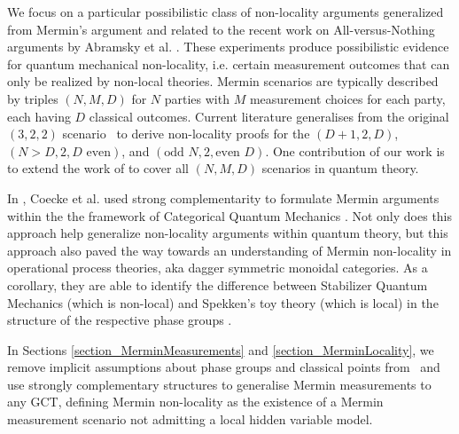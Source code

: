         We focus on a particular possibilistic class of non-locality arguments generalized from Mermin's argument \cite{mermin1990quantum} and related to the recent work on All-versus-Nothing arguments by Abramsky et al. \cite{NLC-AvN}. These experiments produce possibilistic evidence for quantum mechanical non-locality, i.e. certain measurement outcomes that can only be realized by non-local theories.  Mermin scenarios are typically described by triples $(N,M,D)$ for $N$ parties with $M$ measurement choices for each party, each having $D$ classical outcomes. Current literature generalises from the original $(3,2,2)$ scenario~\cite{mermin1990quantum} to derive non-locality proofs for the $(D+1,2,D)$\cite{zukowski-GHZ-multiport}, $(N>D, 2, D \mbox{ even})$\cite{cerf-GHZ-many}, and $(\mbox{odd }N, 2, \mbox{even }D)$\cite{lee-even-dim}. One contribution of our work is to extend the work of \cite{coecke2012strong} to cover all $(N,M,D)$ scenarios in quantum theory.

In \cite{coecke2012strong}, Coecke et al. used strong complementarity to formulate Mermin arguments within the the framework of Categorical Quantum Mechanics \cite{abramsky2008categorical}. Not only does this approach help generalize non-locality arguments within quantum theory, but this approach also paved the way towards an understanding of Mermin non-locality in operational process theories, aka dagger symmetric monoidal categories. As a corollary, they are able to identify the difference between Stabilizer Quantum Mechanics (which is non-local) and Spekken's toy theory (which is local) in the structure of the respective phase groups \cite{coecke2012strong,coecke2011phase}.

In Sections \ref{section_MerminMeasurements} and \ref{section_MerminLocality}, we remove implicit assumptions about phase groups and classical points from~\cite{coecke2012strong} and use strongly complementary structures to generalise Mermin measurements to any GCT, defining Mermin non-locality as the existence of a Mermin measurement scenario not admitting a local hidden variable model.

